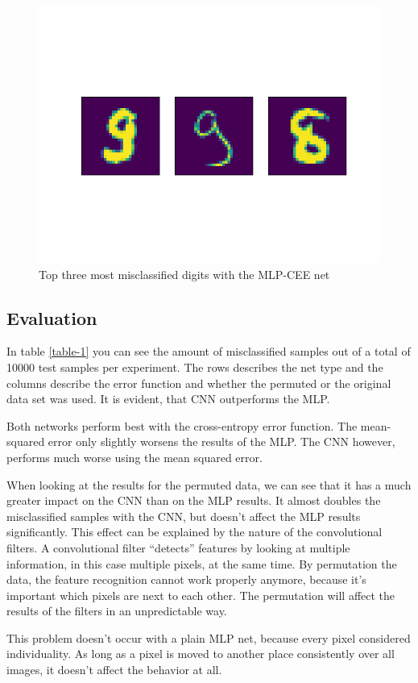 \documentclass{article}[]
\begin{document}
\begin{figure}[H]
	\centering
	\includegraphics[width=0.5\linewidth]{img/mpl_categorial_cross_non_perm.png}
	\caption{Top three most misclassified digits with the MLP-CEE net}
	\label{fig:mlp}
\end{figure}

\subsection{Evaluation}
\label{evaluation}

In table \ref{table-1} you can see the amount of misclassified samples out of a total of 10000 test samples per experiment.
The rows describes the net type and the columns describe the error function and whether the permuted or the original data set was used.
It is evident, that CNN outperforms the MLP.

Both networks perform best with the cross-entropy error function.
The mean-squared error only slightly worsens the results of the MLP.
The CNN however, performs much worse using the mean squared error.

When looking at the results for the permuted data, we can see that it has a much greater impact on the CNN than on the MLP results.
It almost doubles the misclassified samples with the CNN, but doesn't affect the MLP results significantly.
This effect can be explained by the nature of the convolutional filters.
A convolutional filter \enquote{detects} features by looking at multiple information, in this case multiple pixels, at the same time.
By permutation the data, the feature recognition cannot work properly anymore, because it's important which pixels are next to each other.
The permutation will affect the results of the filters in an unpredictable way.

This problem doesn't occur with a plain MLP net, because every pixel considered individuality.
As long as a pixel is moved to another place consistently over all images, it doesn't affect the behavior at all.
\end{document}
